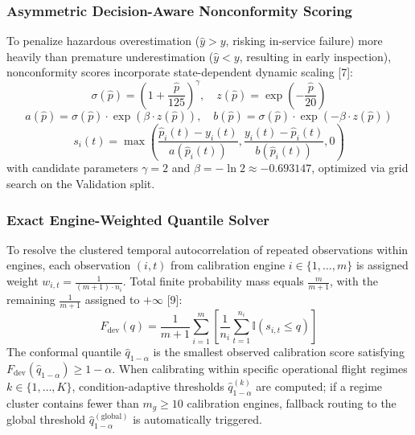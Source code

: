 \documentclass[12pt,a4paper]{article}
\begin{document}
\subsubsection*{Asymmetric Decision-Aware Nonconformity Scoring}
To penalize hazardous overestimation ($\hat{y} > y$, risking in-service failure) more heavily than premature underestimation ($\hat{y} < y$, resulting in early inspection), nonconformity scores incorporate state-dependent dynamic scaling [7]:
\begin{equation}
\sigma(\hat{p}) = \left(1 + \frac{\hat{p}}{125}\right)^\gamma, \quad z(\hat{p}) = \exp\left(-\frac{\hat{p}}{20}\right)
\end{equation}
\begin{equation}
a(\hat{p}) = \sigma(\hat{p}) \cdot \exp(\beta \cdot z(\hat{p})), \quad b(\hat{p}) = \sigma(\hat{p}) \cdot \exp(-\beta \cdot z(\hat{p}))
\end{equation}
\begin{equation}
s_i(t) = \max\left( \frac{\hat{p}_i(t) - y_i(t)}{a(\hat{p}_i(t))}, \frac{y_i(t) - \hat{p}_i(t)}{b(\hat{p}_i(t))}, 0 \right)
\end{equation}
with candidate parameters $\gamma = 2$ and $\beta = -\ln 2 \approx -0.693147$, optimized via grid search on the Validation split.

\subsubsection*{Exact Engine-Weighted Quantile Solver}
To resolve the clustered temporal autocorrelation of repeated observations within engines, each observation $(i, t)$ from calibration engine $i \in \{1, \dots, m\}$ is assigned weight $w_{i,t} = \frac{1}{(m+1) \cdot n_i}$. Total finite probability mass equals $\frac{m}{m+1}$, with the remaining $\frac{1}{m+1}$ assigned to $+\infty$ [9]:
\begin{equation}
F_{\text{dev}}(q) = \frac{1}{m+1} \sum_{i=1}^m \left[ \frac{1}{n_i} \sum_{t=1}^{n_i} \mathbb{I}(s_{i,t} \le q) \right]
\end{equation}
The conformal quantile $\hat{q}_{1-\alpha}$ is the smallest observed calibration score satisfying $F_{\text{dev}}(\hat{q}_{1-\alpha}) \ge 1 - \alpha$. When calibrating within specific operational flight regimes $k \in \{1, \dots, K\}$, condition-adaptive thresholds $\hat{q}_{1-\alpha}^{(k)}$ are computed; if a regime cluster contains fewer than $m_g \ge 10$ calibration engines, fallback routing to the global threshold $\hat{q}_{1-\alpha}^{(\text{global})}$ is automatically triggered.
\end{document}

